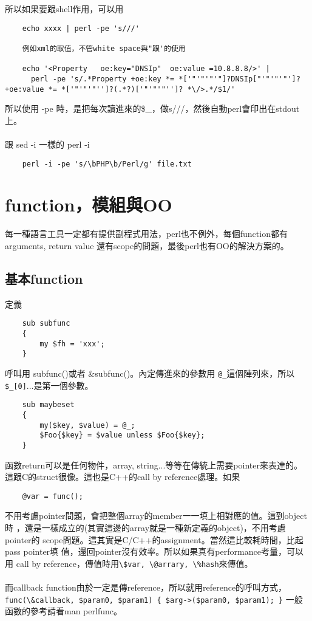     所以如果要跟shell作用，可以用
    \begin{verbatim}
    echo xxxx | perl -pe 's///'

    例如xml的取值，不管white space與"跟'的使用

    echo '<Property   oe:key="DNSIp"  oe:value =10.8.8.8/>' |
      perl -pe 's/.*Property +oe:key *= *['"'"'"'"]?DNSIp["'"'"'"']? +oe:value *= *['"'"'"'']?(.*?)['"'"'"'']? *\/>.*/$1/'
    \end{verbatim}
    所以使用 -pe 時，是把每次讀進來的\$\_，做s///，然後自動perl會印出在stdout上。
    \\\\
    跟 sed -i 一樣的 perl -i
    \begin{verbatim}
    perl -i -pe 's/\bPHP\b/Perl/g' file.txt
    \end{verbatim}

    \section{function，模組與OO}
    每一種語言工具一定都有提供副程式用法，perl也不例外，每個function都有
    arguments, return value 還有scope的問題，最後perl也有OO的解決方案的。
    \subsection{基本function}
    定義
    \begin{verbatim}
    sub subfunc
    {
        my $fh = 'xxx';
    }

    \end{verbatim}
    呼叫用 subfunc()或者 \&subfunc()。內定傳進來的參數用 \verb=@_=這個陣列來，所以
    \verb=$_[0]=...是第一個參數。
    \begin{verbatim}
    sub maybeset
    {
        my($key, $value) = @_;
        $Foo{$key} = $value unless $Foo{$key};
    }
    \end{verbatim}
    函數return可以是任何物件，array, string...等等在傳統上需要pointer來表達的。
    這跟C的struct很像。這也是C++的call by reference處理。如果
    \begin{verbatim}
    @var = func();
    \end{verbatim}
    不用考慮pointer問題，會把整個array的member一一填上相對應的值。這到object時
    ，還是一樣成立的(其實這邊的array就是一種新定義的object)，不用考慮pointer的
    scope問題。這其實是C/C++的assignment。當然這比較耗時間，比起pass pointer填
    值，還回pointer沒有效率。所以如果真有performance考量，可以用
    call by reference，傳值時用\verb=\$var, \@arrary, \%hash=來傳值。
    \\\\
    而callback function由於一定是傳reference，所以就用reference的呼叫方式，
    \verb=func(\&callback, $param0, $param1) { $arg->($param0, $param1); }=
    一般函數的參考請看man perlfunc。

